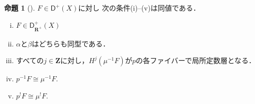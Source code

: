 \documentclass[leqno, 10pt, a4paper, dvipdfmx]{jsarticle}
\theoremstyle{definition}
\newcommand{\zz}{\mathbf{Z}}
\newcommand{\rr}{\mathbf{R}}
\numberwithin{equation}{section}
\theoremstyle{mystyle}
\newtheorem{PRP}[AXM]{命題}
\renewenvironment{leftbar}{%
  \def\FrameCommand{\textcolor{lightgray}{\vrule width 4pt} \hspace{10pt}}%
  \MakeFramed {\advance\hsize-\width \FrameRestore}}%
{\endMakeFramed}
\begin{document}
\begin{leftbar}
\begin{PRP}[{\cite[Proposition 3.7.2]{KS90}}]
    \(F\in\mathsf{D}^{+}(X)\)に対し
    次の条件(i)--(v)は同値である．
    \begin{enumerate}[(i)]
        \item \(F\in \mathsf{D}^{+}_{\rr^+}(X)\)
        \item \(\alpha\)と\(\beta\)はどちらも同型である．
        \item すべての\(j\in\zz\)に対し，\(H^j(\mu^{-1}F)\)が\(p\)の各ファイバーで局所定数層となる．
        \item \(p^{-1}F\cong \mu^{-1}F\).
        \item \(p^{!}F\cong \mu^{!}F\).
    \end{enumerate}
\end{PRP}    
\end{leftbar}
\end{document}
